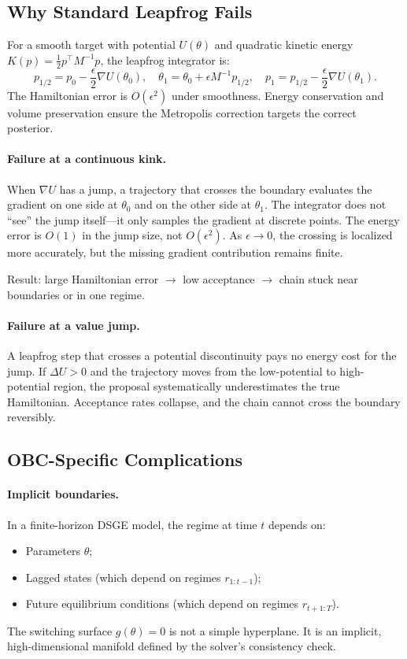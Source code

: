 \subsection{Why Standard Leapfrog Fails}

For a smooth target with potential $U(\theta)$ and quadratic kinetic energy
$K(p) = \frac{1}{2} p^\top M^{-1} p$, the leapfrog integrator is:
\begin{equation}
  p_{1/2} = p_0 - \frac{\epsilon}{2} \nabla U(\theta_0),
  \quad
  \theta_1 = \theta_0 + \epsilon M^{-1} p_{1/2},
  \quad
  p_1 = p_{1/2} - \frac{\epsilon}{2} \nabla U(\theta_1).
  \label{eq:standard-leapfrog}
\end{equation}
The Hamiltonian error is $O(\epsilon^2)$ under smoothness. Energy conservation
and volume preservation ensure the Metropolis correction targets the correct
posterior.

\paragraph{Failure at a continuous kink.}
When $\nabla U$ has a jump, a trajectory that crosses the boundary evaluates
the gradient on one side at $\theta_0$ and on the other side at $\theta_1$.
The integrator does not ``see'' the jump itself—it only samples the gradient
at discrete points. The energy error is $O(1)$ in the jump size, not $O(\epsilon^2)$.
As $\epsilon \to 0$, the crossing is localized more accurately, but the
missing gradient contribution remains finite.

Result: large Hamiltonian error $\to$ low acceptance $\to$ chain stuck near
boundaries or in one regime.

\paragraph{Failure at a value jump.}
A leapfrog step that crosses a potential discontinuity pays no energy cost for
the jump. If $\Delta U > 0$ and the trajectory moves from the low-potential to
high-potential region, the proposal systematically underestimates the true
Hamiltonian. Acceptance rates collapse, and the chain cannot cross the
boundary reversibly.

\subsection{OBC-Specific Complications}

\paragraph{Implicit boundaries.}
In a finite-horizon DSGE model, the regime at time $t$ depends on:
\begin{itemize}
  \item Parameters $\theta$;
  \item Lagged states (which depend on regimes $r_{1:t-1}$);
  \item Future equilibrium conditions (which depend on regimes $r_{t+1:T}$).
\end{itemize}
The switching surface $g(\theta) = 0$ is not a simple hyperplane. It is an
implicit, high-dimensional manifold defined by the solver's consistency check.

